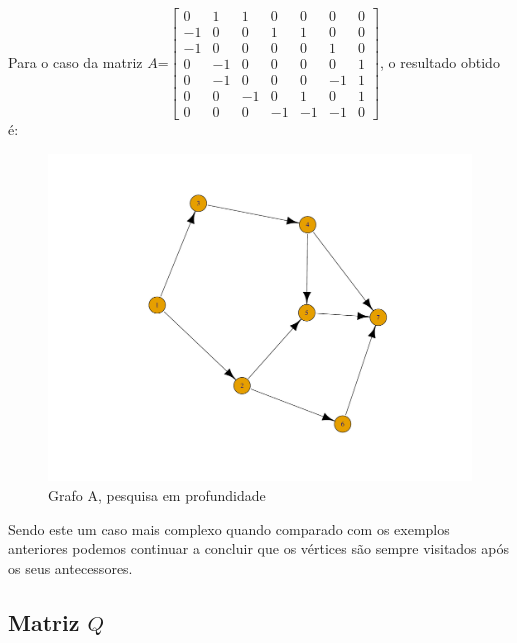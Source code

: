 \documentclass[a4paper,12pt]{report}
\begin{document}
Para o caso da matriz $A$=$\begin{bmatrix}
    0&1&1&0&0&0&0\\
    -1&0&0&1&1&0&0\\
    -1&0&0&0&0&1&0\\
    0&-1&0&0&0&0&1\\
    0&-1&0&0&0&-1&1\\
    0&0&-1&0&1&0&1\\
    0&0&0&-1&-1&-1&0
\end{bmatrix}$, o resultado obtido é:
\begin{figure}[H]
    \centering
        \includegraphics[scale=0.25]{img/dfsA.pdf}
    \caption{Grafo A, pesquisa em profundidade}
    \label{fig:dfsP}
\end{figure}

Sendo este um caso mais complexo quando comparado com os exemplos anteriores podemos continuar a concluir que os vértices são sempre visitados após os seus antecessores.

\subsection*{Matriz $Q$}
\end{document}
